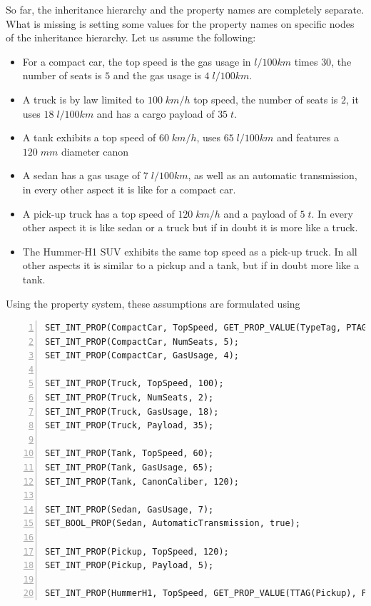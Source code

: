 \noindent
So far, the inheritance hierarchy and the property names are completely
separate. What is missing is setting some values for the property
names on specific nodes of the inheritance hierarchy. Let us assume
the following:
\begin{itemize}
\item For a compact car, the top speed is the gas usage in $l/100km$
  times $30$, the number of seats is $5$ and the gas usage is
  $4\;l/100km$.
\item A truck is by law limited to $100\;km/h$ top speed, the number
  of seats is $2$, it uses $18\;l/100km$ and has a cargo payload of
  $35\;t$.
\item A tank exhibits a top speed of $60\;km/h$, uses $65\;l/100km$
  and features a $120\;mm$ diameter canon 
\item A sedan has a gas usage of $7\;l/100km$, as well as an automatic
  transmission, in every other aspect it is like for a compact car.
\item A pick-up truck has a top speed of $120\;km/h$ and a payload of
  $5\;t$. In every other aspect it is like sedan or a truck but if in
  doubt it is more like a truck.
\item The Hummer-H1 SUV exhibits the same top speed as a pick-up
  truck.  In all other aspects it is similar to a pickup and a tank,
  but if in doubt more like a tank.
\end{itemize}

\noindent
Using the \Dumux property system, these assumptions are formulated
using
\begin{lstlisting}[name=propsyscars,basicstyle=\ttfamily\scriptsize,numbers=left,numberstyle=\tiny, numbersep=5pt]
SET_INT_PROP(CompactCar, TopSpeed, GET_PROP_VALUE(TypeTag, PTAG(GasUsage)) * 30);
SET_INT_PROP(CompactCar, NumSeats, 5);
SET_INT_PROP(CompactCar, GasUsage, 4);

SET_INT_PROP(Truck, TopSpeed, 100);
SET_INT_PROP(Truck, NumSeats, 2);
SET_INT_PROP(Truck, GasUsage, 18);
SET_INT_PROP(Truck, Payload, 35);

SET_INT_PROP(Tank, TopSpeed, 60);
SET_INT_PROP(Tank, GasUsage, 65);
SET_INT_PROP(Tank, CanonCaliber, 120);

SET_INT_PROP(Sedan, GasUsage, 7);
SET_BOOL_PROP(Sedan, AutomaticTransmission, true);

SET_INT_PROP(Pickup, TopSpeed, 120);
SET_INT_PROP(Pickup, Payload, 5);

SET_INT_PROP(HummerH1, TopSpeed, GET_PROP_VALUE(TTAG(Pickup), PTAG(TopSpeed)));
\end{lstlisting}

